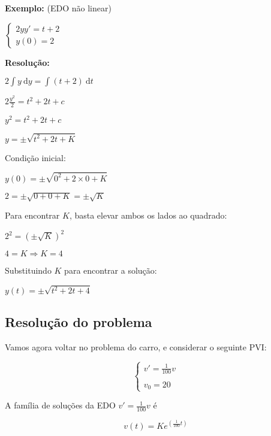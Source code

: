 \documentclass[a4paper]{article}
\newcommand{\ud}{\mathrm{\ d}}
\begin{document}
\hrulefill

\begin{multicols}{2}
{\bf Exemplo:} (EDO não linear)

$
\left\{
  \begin{array}{l}
    2yy'=t+2\\
    y(0)=2
  \end{array}
\right.
$

\bigskip
{\bf Resolução:}

$2\int y \ud y = \int (t+2) \ud t$

\smallskip

$2\frac{y^2}{2} = t^2 + 2t + c$

\smallskip

$y^2 = t^2 + 2t + c$

\smallskip

$y = \pm \sqrt{t^2 + 2t +K}$

\smallskip

Condição inicial:

$y(0)=\pm \sqrt{0^2 + 2\times 0 +K}$

$2 = \pm \sqrt{0 + 0 +K} = \pm \sqrt{K}$

Para encontrar $K$, basta elevar ambos os lados ao quadrado:

$2^2 = \left( \pm \sqrt{K} \right)^2$

$4 = K \Rightarrow K=4$

Substituindo $K$ para encontrar a solução:

$y(t) = \pm \sqrt{t^2 + 2t +4}$
\end{multicols}

\hrulefill

\subsection{Resolução do problema}

Vamos agora voltar no problema do carro, e considerar o seguinte PVI:

\begin{displaymath}
  \left\{
    \begin{array}{l}
      v'=\frac{1}{100}v\\
      \\
      v_0 = 20
    \end{array}
  \right.
\end{displaymath}

A família de soluções da EDO $v'=\frac{1}{100}v$ é

\begin{displaymath}
  v(t) = Ke^{(\frac{1}{100}t)}
\end{displaymath}
\end{document}
